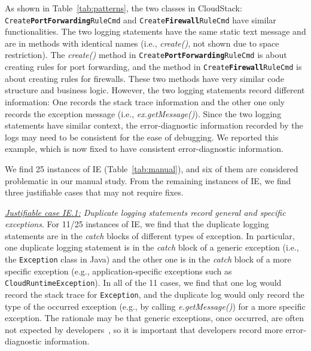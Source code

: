 As shown in Table~\ref{tab:patterns}, the two classes in CloudStack: {\tt\small Create\textbf{PortForwarding}RuleCmd} and {\tt\small Create\textbf{Firewall}RuleCmd} have similar functionalities. The two logging statements have the same static text message and are in methods with identical names (i.e., {\em create()}, not shown due to space restriction). %
The {\em create()} method in {\tt\small Create\textbf{PortForwarding}RuleCmd} is about creating rules for port forwarding, and the method in {\tt\small Create\textbf{Firewall}RuleCmd} is about creating rules for firewalls. These two methods have very similar code structure and business logic. However, the two logging statements record different information: One records the stack trace information and the other one only records the exception message (i.e., {\em ex.getMessage()}). Since the two logging statements have similar context, the error-diagnostic information recorded by the logs may need to be consistent for the ease of debugging. We reported this example, which is now fixed to have consistent error-diagnostic information.

 We find 25 instances of IE (Table~\ref{tab:manual}), and six of them are considered problematic in our manual study. %
From the remaining instances of IE, we find three justifiable cases that may not require fixes.

{\em \underline{Justifiable case IE.1:} Duplicate logging statements record general and specific exceptions}.
For 11/25 instances of IE, we find that the duplicate logging statements are in the {\em catch} blocks of different types of exception. In particular, one duplicate logging statement is in the {\em catch} block of a generic exception (i.e., the {\tt\small Exception} class in Java) and the other one is in the {\em catch} block of a more specific exception (e.g., application-specific exceptions such as {\tt\small CloudRuntimeException}). In all of the 11 cases, we find that one log would record the stack trace for \texttt{\small Exception}, and the duplicate log would only record the type of the occurred exception (e.g., by calling {\em e.getMessage()}) for a more specific exception. The rationale may be that generic exceptions, once occurred, are often not expected by developers~\cite{Yuan:2014:STP:2685048.2685068}, so it is important that developers record more error-diagnostic information.

